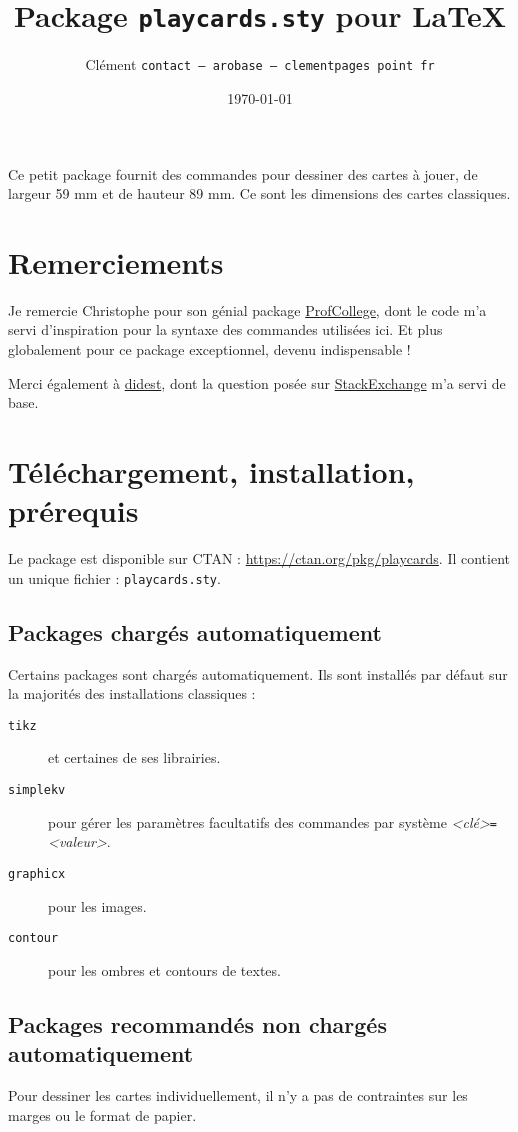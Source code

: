 \documentclass[a4paper, 12pt]{article}
\title{Package \texttt{playcards.sty} pour \LaTeX}
\date{\today}
\author{Clément \bsc{Pagès} \texttt{contact -- arobase -- clementpages point fr}}
\newcommand{\package}[1]{\texttt{#1}}
\newcommand{\kv}[2]{\textit{<#1>}\texttt=\textit{<#2>}}
\begin{document}
\maketitle

Ce petit package fournit des commandes pour dessiner des cartes à jouer, de largeur 59 mm et de hauteur 89 mm. Ce sont les dimensions des cartes classiques.

\tableofcontents

\section*{Remerciements}
Je remercie Christophe  pour son génial package \href{https://ctan.org/pkg/profcollege}{ProfCollege}, dont le code m'a servi d'inspiration pour la syntaxe des commandes utilisées ici. Et plus globalement pour ce package exceptionnel, devenu indispensable !

Merci également à \href{https://tex.stackexchange.com/users/1948/didest}{didest}, dont la question posée sur \href{https://tex.stackexchange.com/questions/47924/creating-playing-cards-using-tikz}{StackExchange} m'a servi de base.

\section{Téléchargement, installation, prérequis}
Le package est disponible sur CTAN : \href{https://ctan.org/pkg/playcards}{https://ctan.org/pkg/playcards}. Il contient un unique fichier : \texttt{playcards.sty}.

	\subsection{Packages chargés automatiquement}
Certains packages sont chargés automatiquement. Ils sont installés par défaut sur la majorités des installations classiques :
\begin{description}
	\item[\package{tikz}] et certaines de ses librairies.
	\item[\package{simplekv}] pour gérer les paramètres facultatifs des commandes par système \kv{clé}{valeur}.
	\item[\package{graphicx}] pour les images. 
	\item[\package{contour}] pour les ombres et contours de textes.
\end{description}

	\subsection{Packages recommandés non chargés automatiquement}
Pour dessiner les cartes individuellement, il n'y a pas de contraintes sur les marges ou le format de papier.
\end{document}
